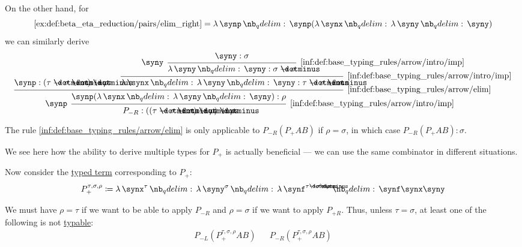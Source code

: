 \begin{example}
\begin{thmenum}
    On the other hand, for
    \begin{equation*}
      \ref{ex:def:beta_eta_reduction/pairs/elim_right} = \qabs \synp \synp (\qabs \synx \qabs \syny \syny)
    \end{equation*}
    we can similarly derive
    \begin{equation*}
      \begin{prooftree}
        \hypo{ \synp: (\tau \synimplies \sigma \synimplies \sigma) \synimplies \rho }

        \hypo{ \syny: \sigma }
        \infer[left label=\( \syny \)]1[\ref{inf:def:base_typing_rules/arrow/intro/imp}]{ \qabs \syny \syny: \sigma \synimplies \sigma }
        \infer1[\ref{inf:def:base_typing_rules/arrow/intro/imp}]{ \qabs \synx \qabs \syny \syny: \tau \synimplies \sigma \synimplies \sigma }

        \infer2[\ref{inf:def:base_typing_rules/arrow/elim}]{ \synp (\qabs \synx \qabs \syny \syny): \rho }
        \infer[left label=\( \synp \)]1[\ref{inf:def:base_typing_rules/arrow/intro/imp}]{ P_{-R}: ((\tau \synimplies \sigma \synimplies \sigma) \synimplies \rho) \synimplies \rho }
      \end{prooftree}
    \end{equation*}

    The rule \ref{inf:def:base_typing_rules/arrow/elim} is only applicable to \( P_{-R} (P_+ A B) \) if \( \rho = \sigma \), in which case \( P_{-R} (P_+ A B): \sigma \).

    We see here how the ability to derive multiple types for \( P_+ \) is actually beneficial --- we can use the same combinator in different situations.

    Now consider the \hyperref[def:typed_lambda_term]{typed term} corresponding to \( P_+ \):
    \begin{equation*}
      P_+^{\tau,\sigma,\rho} \coloneqq \qabs {\synx^\tau} \qabs {\syny^\sigma} \qabs {\synf^{\tau \synimplies \sigma \synimplies \rho}} \synf \synx \syny
    \end{equation*}

    We must have \( \rho = \tau \) if we want to be able to apply \( P_{-R} \) and \( \rho = \sigma \) if we want to apply \( P_{+R} \). Thus, unless \( \tau = \sigma \), at least one of the following is not \hyperref[def:typability]{typable}:
    \begin{align*}
      P_{-L} (P_+^{\tau,\sigma,\rho} A B)
      &&
      P_{-R} (P_+^{\tau,\sigma,\rho} A B)
    \end{align*}


\end{thmenum}
\end{example}
